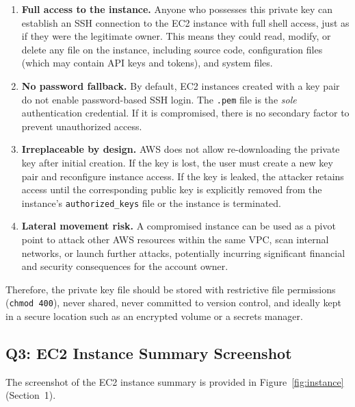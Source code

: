 \documentclass[11pt]{article}
\begin{document}
\begin{enumerate}
  \item \textbf{Full access to the instance.}
    Anyone who possesses this private key can establish an SSH connection to the EC2 instance with full shell access, just as if they were the legitimate owner.
    This means they could read, modify, or delete any file on the instance, including source code, configuration files (which may contain API keys and tokens), and system files.

  \item \textbf{No password fallback.}
    By default, EC2 instances created with a key pair do not enable password-based SSH login.
    The \texttt{.pem} file is the \emph{sole} authentication credential.
    If it is compromised, there is no secondary factor to prevent unauthorized access.

  \item \textbf{Irreplaceable by design.}
    AWS does not allow re-downloading the private key after initial creation.
    If the key is lost, the user must create a new key pair and reconfigure instance access.
    If the key is leaked, the attacker retains access until the corresponding public key is explicitly removed from the instance's \texttt{authorized\_keys} file or the instance is terminated.

  \item \textbf{Lateral movement risk.}
    A compromised instance can be used as a pivot point to attack other AWS resources within the same VPC, scan internal networks, or launch further attacks, potentially incurring significant financial and security consequences for the account owner.
\end{enumerate}

Therefore, the private key file should be stored with restrictive file permissions (\texttt{chmod 400}), never shared, never committed to version control, and ideally kept in a secure location such as an encrypted volume or a secrets manager.

\subsection*{Q3: EC2 Instance Summary Screenshot}

The screenshot of the EC2 instance summary is provided in Figure~\ref{fig:instance} (Section~1).



\end{document}
